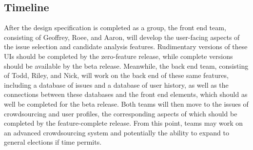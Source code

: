 \documentclass[11pt]{article}
\begin{document}
\subsection{Timeline}

After the design specification is completed as a group, the front end team, consisting of Geoffrey, Roee, and Aaron, will develop the user-facing aspects of the issue selection and candidate analysis features. Rudimentary versions of these UIs should be completed by the zero-feature release, while complete versions should be available by the beta release. Meanwhile, the back end team, consisting of Todd, Riley, and Nick, will work on the back end of these same features, including a database of issues and a database of user history, as well as the connections between these databases and the front end elements, which should as well be completed for the beta release. Both teams will then move to the issues of crowdsourcing and user profiles, the corresponding aspects of which should be completed by the feature-complete release. From this point, teams may work on an advanced crowdsourcing system and potentially the ability to expand to general elections if time permits.\\
\end{document}
